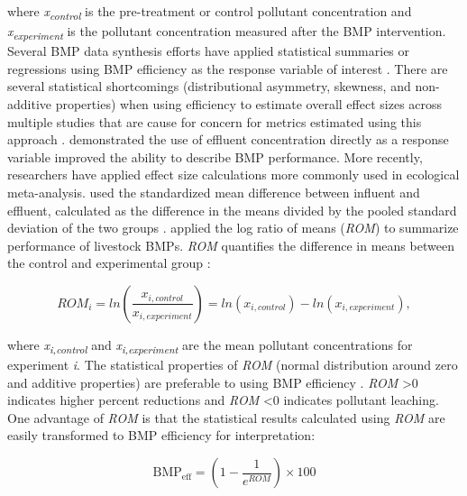 \documentclass[utf8]{FrontiersinHarvard}
\begin{document}
where \emph{x\textsubscript{control}} is the pre-treatment or control pollutant concentration and \emph{x\textsubscript{experiment}} is the pollutant concentration measured after the BMP intervention.
Several BMP data synthesis efforts have applied statistical summaries or regressions using BMP efficiency as the response variable of interest \citep{agouridisLivestockGrazingManagement2005, claryBMPPerformanceAnalysis2011, kochNitrogenRemovalStormwater2014, krogerReviewBestManagement2012, liuReviewEffectivenessBest2017, simpsonDevelopingBestManagement2009}.
There are several statistical shortcomings (distributional asymmetry, skewness, and non-additive properties) when using efficiency to estimate overall effect sizes across multiple studies that are cause for concern for metrics estimated using this approach \citep{nuzzoPercentDifferencesAnother2018, coleStatisticsNotesWhat2017}.
\citet{barrettPerformanceComparisonStructural2005} demonstrated the use of effluent concentration directly as a response variable improved the ability to describe BMP performance.
More recently, researchers have applied effect size calculations more commonly used in ecological meta-analysis.
\citet{horvathEffectsRegionalClimate2023} used the standardized mean difference between influent and effluent, calculated as the difference in the means divided by the pooled standard deviation of the two groups \citep{hedgesStatisticalMethodsMetaanalysis1985}.
\citet{grudzinskiDoesRiparianFencing2020} applied the log ratio of means (\emph{ROM}) to summarize performance of livestock BMPs.
\emph{ROM} quantifies the difference in means between the control and experimental group \citep{hedgesMetaanalysisResponseRatios1999}:

\[
ROM_i = ln\left(\frac{x_{i,control}}{x_{i,experiment}}\right) = ln(x_{i, control})-ln(x_{i, experiment}),
\]

where \emph{x\textsubscript{i,control}} and \emph{x\textsubscript{i,experiment}} are the mean pollutant concentrations for experiment \emph{i}.
The statistical properties of \emph{ROM} (normal distribution around zero and additive properties) are preferable to using BMP efficiency \citep{osenbergEffectSizeEcological1997, hedgesMetaanalysisResponseRatios1999}.
\emph{ROM} \textgreater 0 indicates higher percent reductions and \emph{ROM} \textless 0 indicates pollutant leaching.
One advantage of \emph{ROM} is that the statistical results calculated using \emph{ROM} are easily transformed to BMP efficiency for interpretation:

\[
\text{BMP}_{\text{eff}} = \left( 1 - \frac{1}{e^{ROM}}\right) \times 100
\]
\end{document}
